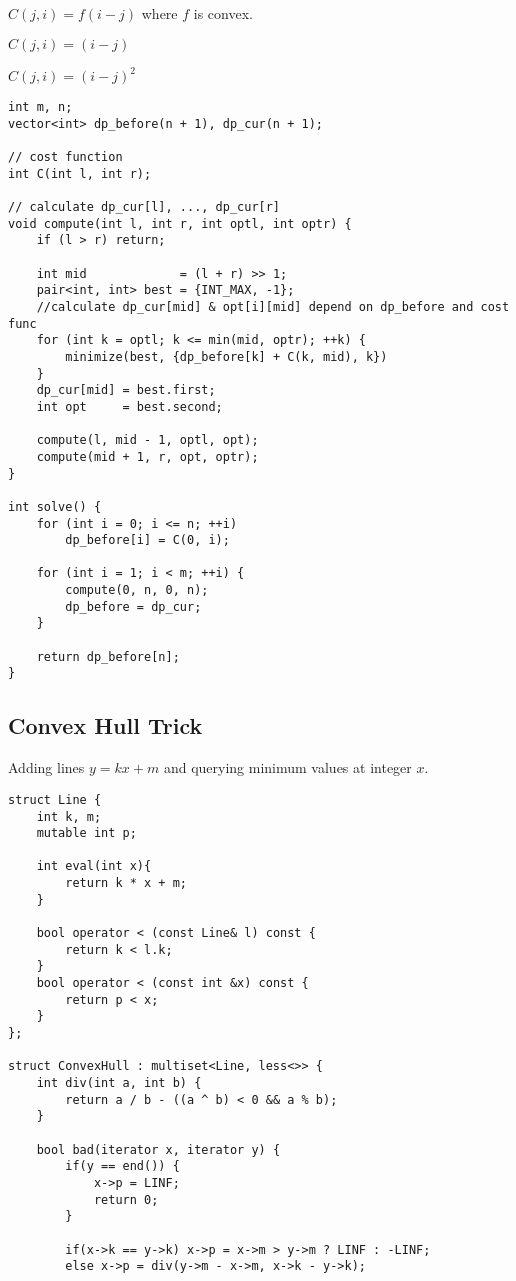 \documentclass[11pt,a4paper]{article}
\begin{document}
\begin{multicols*}{2}
$C(j, i) = f(i - j)$ where $f$ is convex.

$C(j, i) = (i - j)$

$C(j, i) = (i - j)^2$
\begin{lstlisting}
int m, n;
vector<int> dp_before(n + 1), dp_cur(n + 1);

// cost function
int C(int l, int r);

// calculate dp_cur[l], ..., dp_cur[r]
void compute(int l, int r, int optl, int optr) {
    if (l > r) return;

    int mid             = (l + r) >> 1;
    pair<int, int> best = {INT_MAX, -1};
    //calculate dp_cur[mid] & opt[i][mid] depend on dp_before and cost func
    for (int k = optl; k <= min(mid, optr); ++k) {
        minimize(best, {dp_before[k] + C(k, mid), k})
    }
    dp_cur[mid] = best.first;
    int opt     = best.second;

    compute(l, mid - 1, optl, opt);
    compute(mid + 1, r, opt, optr);
}

int solve() {
    for (int i = 0; i <= n; ++i)
        dp_before[i] = C(0, i);

    for (int i = 1; i < m; ++i) {
        compute(0, n, 0, n);
        dp_before = dp_cur;
    }

    return dp_before[n];
}
\end{lstlisting}

\subsection{Convex Hull Trick}
Adding lines $y = kx + m$ and querying minimum values at integer $x$.
\begin{lstlisting}
struct Line {
    int k, m;
    mutable int p;
    
    int eval(int x){
    	return k * x + m;
    }
    
    bool operator < (const Line& l) const {
        return k < l.k;
    }
    bool operator < (const int &x) const {
        return p < x;
    }
};
 
struct ConvexHull : multiset<Line, less<>> {
    int div(int a, int b) {
        return a / b - ((a ^ b) < 0 && a % b);
    }

    bool bad(iterator x, iterator y) {
        if(y == end()) { 
            x->p = LINF;
            return 0; 
        }

        if(x->k == y->k) x->p = x->m > y->m ? LINF : -LINF;
        else x->p = div(y->m - x->m, x->k - y->k);


\end{lstlisting}
\end{multicols*}
\end{document}
